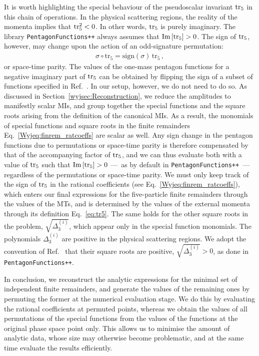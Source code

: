 \documentclass[main.tex]{subfiles}
\begin{document}
It is worth highlighting the special behaviour of the pseudoscalar invariant $\operatorname{\rm tr}_5$ in this chain of operations. In the physical scattering regions, the reality of the momenta implies that $\operatorname{\rm tr}_5^2 < 0$. In other words, $\operatorname{\rm tr}_5$ is purely imaginary. The library \texttt{PentagonFunctions++} always assumes that $\text{Im}\left[\operatorname{\rm tr}_5\right]>0$. The sign of $\operatorname{\rm tr}_5$, however, may change upon the action of an odd-signature permutation:
\begin{align}
\sigma \circ \text{tr}_5 = \text{sign}(\sigma) \, \text{tr}_5 \,,
\end{align}
or space-time parity.
The values of the one-mass pentagon functions for a negative imaginary part of $\operatorname{\rm tr}_5$ can be obtained by flipping the sign of a subset of functions specified in Ref.~\cite{Chicherin:2021dyp}. In our setup, however, we do not need to do so. As discussed in Section~\ref{wyjsec:Reconstruction}, we reduce the amplitudes to manifestly scalar MIs, and group together the special functions and the square roots arising from the definition of the canonical MIs. As a result, the monomials of special functions and square roots in the finite remainders Eq.~\ref{Wyjeq:finrem_ratcoeffs} are scalar as well. Any sign change in the pentagon functions due to permutations or space-time parity is therefore compensated by that of the accompanying factor of $\operatorname{\rm tr}_5$, and we can thus evaluate both with a value of $\operatorname{\rm tr}_5$ such that $\text{Im}\left[\operatorname{\rm tr}_5\right]>0$ ---~as by default in \texttt{PentagonFunctions++}~--- regardless of the permutations or space-time parity. We must only keep track of the sign of $\operatorname{\rm tr}_5$ in the rational coefficients (see Eq.~\ref{Wyjeq:finrem_ratcoeffs}), which enters our final expressions for the five-particle finite remainders through the values of the MTs, and is determined by the values of the external momenta through its definition Eq.~\ref{eq:tr5}.
The same holds for the other square roots in the problem, $\sqrt{\Delta_3^{(i)}}$, which appear only in the special function monomials. The polynomials $\Delta_3^{(i)}$ are positive in the physical scattering regions. We adopt the convention of Ref.~\cite{Chicherin:2021dyp} that their square roots are positive, $\sqrt{\Delta_3^{(i)}}>0$, as done in \texttt{PentagonFunctions++}.

In conclusion, we reconstruct the analytic expressions for the minimal set of independent finite remainders, and generate the values of the remaining ones by permuting the former at the numerical evaluation stage. We do this by evaluating the rational coefficients at permuted points, whereas we obtain the values of all permutations of the special functions from the values of the functions at the original phase space point only. This allows us to minimise the amount of analytic data, whose size may otherwise become problematic, and at the same time evaluate the results efficiently.
\end{document}
